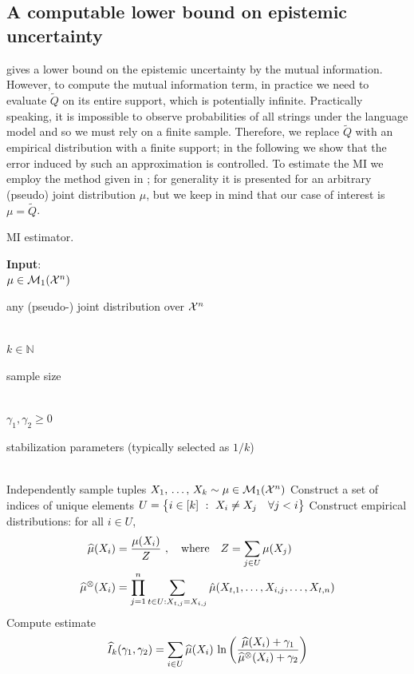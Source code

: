 \documentclass[a4paper]{article}
\theoremstyle{plain}
\theoremstyle{definition}
\theoremstyle{plain}
\begin{document}
\subsection{A computable lower bound on epistemic uncertainty}
%
 gives a lower bound on the epistemic uncertainty by the mutual information.
However, to compute the mutual information term, in practice we need to evaluate
$\widetilde Q$ on its entire support, which is potentially infinite.
%
Practically speaking, it is impossible to observe probabilities of all strings
under the language model and so we must rely on a finite sample.
%
Therefore, we replace $\widetilde Q$ with an empirical distribution with a finite
support; in the following we show that the error induced by such an
approximation is controlled.
%
To estimate the MI we employ the method given in ; for generality it is
presented for an arbitrary (pseudo) joint distribution $\mu$,
but we keep in mind that our case of interest is $\mu = \widetilde Q$.
\begin{algorithm}[t]
\caption{MI estimator.}
\label{alg:MI}
\begin{algorithmic}[1]
  \STATE \textbf{Input}:\\
  \quad $\mu \in {\mathcal{M}}_1({\mathcal{X}}^n)$ \dotfill \parbox{8cm}{ any (pseudo-) joint distribution over ${\mathcal{X}}^n$ }\\[2mm]
  \quad $k \in \mathbb{N}$ \dotfill \parbox{8cm}{ sample size }\\[2mm]
  \quad $\gamma_1, \gamma_2 \geq 0 $ \dotfill \parbox{8cm}{ stabilization parameters (typically selected as $1/k$) }\\[2mm]
  \STATE Independently sample tuples $X_1, \, \ldots, \, X_k \sim \mu \in {\mathcal{M}}_1({\mathcal{X}}^n)$
  \STATE Construct a set of indices of unique elements
  $U = \big\{i \in [k] ~:~ X_i \neq X_j \quad \forall j < i \big\}$
  \STATE Construct empirical distributions: for all $i \in U$,
  \begin{align*}
    \widehat \mu(X_i) &= \frac{\mu(X_i)}{Z}~, \quad \text{where} \quad Z = \sum_{j \in U} \mu(X_j)\\
    \widehat \mu^{\otimes}(X_i)
  &=
    \prod_{j=1}^n \sum_{t \in U : X_{t,j} = X_{i,j}} \hat \mu(X_{t,1}, \ldots, X_{i,j}, \ldots, X_{t,n})
  \end{align*}
  \STATE Compute estimate
  \begin{align*}
    \widehat I_k(\gamma_1, \gamma_2) = \sum_{i \in U} \widehat \mu(X_i) \, \ln\left( 
    \frac{\widehat \mu(X_i) + \gamma_1}{\widehat \mu^{\otimes}(X_i) + \gamma_2}
     \right)
  \end{align*}
\end{algorithmic}
\end{algorithm}
\end{document}
